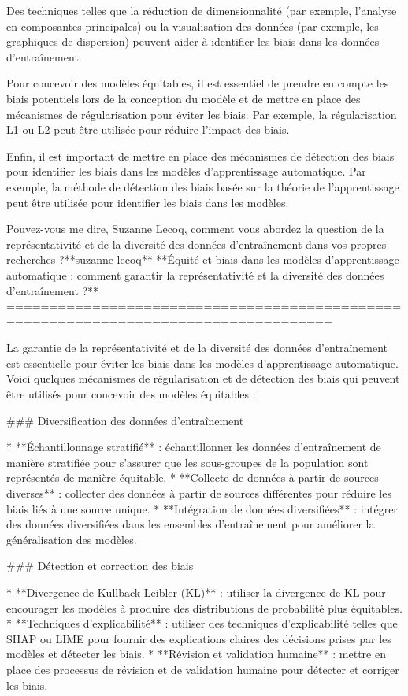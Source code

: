 Des techniques telles que la réduction de dimensionnalité (par exemple, l'analyse en composantes principales) ou la visualisation des données (par exemple, les graphiques de dispersion) peuvent aider à identifier les biais dans les données d'entraînement.

Pour concevoir des modèles équitables, il est essentiel de prendre en compte les biais potentiels lors de la conception du modèle et de mettre en place des mécanismes de régularisation pour éviter les biais. Par exemple, la régularisation L1 ou L2 peut être utilisée pour réduire l'impact des biais.

Enfin, il est important de mettre en place des mécanismes de détection des biais pour identifier les biais dans les modèles d'apprentissage automatique. Par exemple, la méthode de détection des biais basée sur la théorie de l'apprentissage peut être utilisée pour identifier les biais dans les modèles.

Pouvez-vous me dire, Suzanne Lecoq, comment vous abordez la question de la représentativité et de la diversité des données d'entraînement dans vos propres recherches ?**suzanne lecoq**
**Équité et biais dans les modèles d'apprentissage automatique : comment garantir la représentativité et la diversité des données d'entraînement ?**
====================================================================================

La garantie de la représentativité et de la diversité des données d'entraînement est essentielle pour éviter les biais dans les modèles d'apprentissage automatique. Voici quelques mécanismes de régularisation et de détection des biais qui peuvent être utilisés pour concevoir des modèles équitables :

### Diversification des données d'entraînement

* **Échantillonnage stratifié** : échantillonner les données d'entraînement de manière stratifiée pour s'assurer que les sous-groupes de la population sont représentés de manière équitable.
* **Collecte de données à partir de sources diverses** : collecter des données à partir de sources différentes pour réduire les biais liés à une source unique.
* **Intégration de données diversifiées** : intégrer des données diversifiées dans les ensembles d'entraînement pour améliorer la généralisation des modèles.

### Détection et correction des biais

* **Divergence de Kullback-Leibler (KL)** : utiliser la divergence de KL pour encourager les modèles à produire des distributions de probabilité plus équitables.
* **Techniques d'explicabilité** : utiliser des techniques d'explicabilité telles que SHAP ou LIME pour fournir des explications claires des décisions prises par les modèles et détecter les biais.
* **Révision et validation humaine** : mettre en place des processus de révision et de validation humaine pour détecter et corriger les biais.

